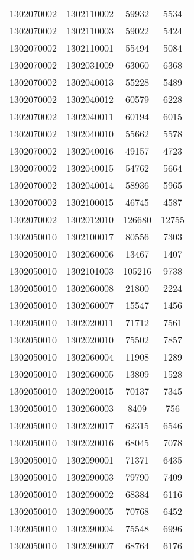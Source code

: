 \begin{longtable}[h]{llcc}
		1302070002 & 1302110002 & 59932 & 5534\\
		1302070002 & 1302110003 & 59022 & 5424\\
		1302070002 & 1302110001 & 55494 & 5084\\
		1302070002 & 1302031009 & 63060 & 6368\\
		1302070002 & 1302040013 & 55228 & 5489\\
		1302070002 & 1302040012 & 60579 & 6228\\
		1302070002 & 1302040011 & 60194 & 6015\\
		1302070002 & 1302040010 & 55662 & 5578\\
		1302070002 & 1302040016 & 49157 & 4723\\
		1302070002 & 1302040015 & 54762 & 5664\\
		1302070002 & 1302040014 & 58936 & 5965\\
		1302070002 & 1302100015 & 46745 & 4587\\
		1302070002 & 1302012010 & 126680 & 12755\\
		1302050010 & 1302100017 & 80556 & 7303\\
		1302050010 & 1302060006 & 13467 & 1407\\
		1302050010 & 1302101003 & 105216 & 9738\\
		1302050010 & 1302060008 & 21800 & 2224\\
		1302050010 & 1302060007 & 15547 & 1456\\
		1302050010 & 1302020011 & 71712 & 7561\\
		1302050010 & 1302020010 & 75502 & 7857\\
		1302050010 & 1302060004 & 11908 & 1289\\
		1302050010 & 1302060005 & 13809 & 1528\\
		1302050010 & 1302020015 & 70137 & 7345\\
		1302050010 & 1302060003 & 8409 & 756\\
		1302050010 & 1302020017 & 62315 & 6546\\
		1302050010 & 1302020016 & 68045 & 7078\\
		1302050010 & 1302090001 & 71371 & 6435\\
		1302050010 & 1302090003 & 79790 & 7409\\
		1302050010 & 1302090002 & 68384 & 6116\\
		1302050010 & 1302090005 & 70768 & 6452\\
		1302050010 & 1302090004 & 75548 & 6996\\
		1302050010 & 1302090007 & 68764 & 6176\\

\end{longtable}
